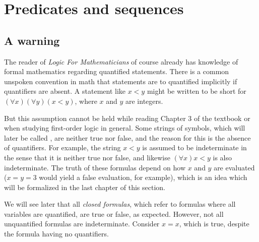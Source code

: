 
\section{Predicates and sequences}

\subsection*{A warning}

The reader of \textit{Logic For Mathematicians} of course already has knowledge of formal mathematics regarding quantified statements. There is a common unspoken convention in math that statements are to quantified implicitly if quantifiers are absent. A statement like \(x < y\) might be written to be short for \((\forall x) (\forall y) (x < y)\), where \(x\) and \(y\) are integers.

But this assumption cannot be held while reading Chapter 3 of the textbook or when studying first-order logic in general. Some strings of symbols, which will later be called \wfs{}, are neither true nor false, and the reason for this is the absence of quantifiers. For example, the string \(x < y\) is assumed to be indeterminate in the sense that it is neither true nor false, and likewise \((\forall x) x < y\) is also indeterminate. The truth of these formulas depend on how \(x\) and \(y\) are evaluated (\(x = y = 3\) would yield a false evaluation, for example), which is an idea which will be formalized in the last chapter of this section.

We will see later that all \textit{closed formulas}, which refer to formulas where all variables are quantified, are true or false, as expected. However, not all unquantified formulas are indeterminate. Consider \(x = x\), which is true, despite the formula having no quantifiers.

\solutions{}

